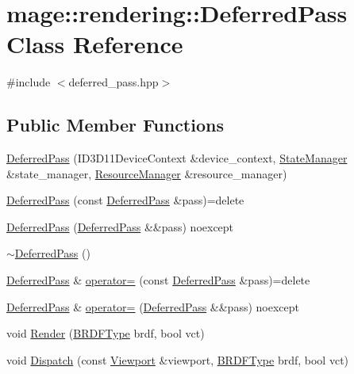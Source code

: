 \hypertarget{classmage_1_1rendering_1_1_deferred_pass}{}\section{mage\+:\+:rendering\+:\+:Deferred\+Pass Class Reference}
\label{classmage_1_1rendering_1_1_deferred_pass}


{\ttfamily \#include $<$deferred\+\_\+pass.\+hpp$>$}

\subsection*{Public Member Functions}
\begin{DoxyCompactItemize}
\item 
\hyperlink{classmage_1_1rendering_1_1_deferred_pass_a3543b3f27812467d425d579d2e226a7a}{Deferred\+Pass} (I\+D3\+D11\+Device\+Context \&device\+\_\+context, \hyperlink{classmage_1_1rendering_1_1_state_manager}{State\+Manager} \&state\+\_\+manager, \hyperlink{classmage_1_1rendering_1_1_resource_manager}{Resource\+Manager} \&resource\+\_\+manager)
\item 
\hyperlink{classmage_1_1rendering_1_1_deferred_pass_ad33a94460acd312de278c4944492368e}{Deferred\+Pass} (const \hyperlink{classmage_1_1rendering_1_1_deferred_pass}{Deferred\+Pass} \&pass)=delete
\item 
\hyperlink{classmage_1_1rendering_1_1_deferred_pass_a606cd3fdf0c6b53e1125d431cf782a6d}{Deferred\+Pass} (\hyperlink{classmage_1_1rendering_1_1_deferred_pass}{Deferred\+Pass} \&\&pass) noexcept
\item 
\hyperlink{classmage_1_1rendering_1_1_deferred_pass_a6b5138ee7624ecb17b30c1e337bd483e}{$\sim$\+Deferred\+Pass} ()
\item 
\hyperlink{classmage_1_1rendering_1_1_deferred_pass}{Deferred\+Pass} \& \hyperlink{classmage_1_1rendering_1_1_deferred_pass_a5b9a7cf23089389be11d6a3c4526bde9}{operator=} (const \hyperlink{classmage_1_1rendering_1_1_deferred_pass}{Deferred\+Pass} \&pass)=delete
\item 
\hyperlink{classmage_1_1rendering_1_1_deferred_pass}{Deferred\+Pass} \& \hyperlink{classmage_1_1rendering_1_1_deferred_pass_a5d701ca8725a2b9a2c95dfd89c0d7c0e}{operator=} (\hyperlink{classmage_1_1rendering_1_1_deferred_pass}{Deferred\+Pass} \&\&pass) noexcept
\item 
void \hyperlink{classmage_1_1rendering_1_1_deferred_pass_af84f89e1b27b397f7e56794a4902f663}{Render} (\hyperlink{namespacemage_1_1rendering_a13c5e70586af4ce254146074ec055bf6}{B\+R\+D\+F\+Type} brdf, bool vct)
\item 
void \hyperlink{classmage_1_1rendering_1_1_deferred_pass_aef24486822bd560da59fb90d1c760b0a}{Dispatch} (const \hyperlink{classmage_1_1rendering_1_1_viewport}{Viewport} \&viewport, \hyperlink{namespacemage_1_1rendering_a13c5e70586af4ce254146074ec055bf6}{B\+R\+D\+F\+Type} brdf, bool vct)
\end{DoxyCompactItemize}
